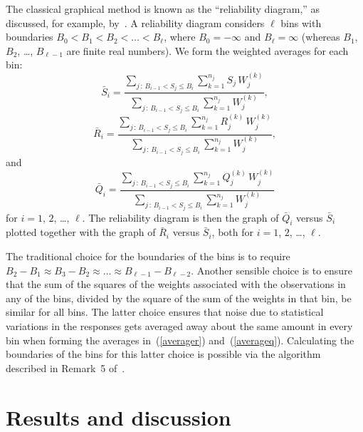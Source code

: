 \documentclass[]{fairmeta}
\begin{document}
The classical graphical method is known as the ``reliability diagram,''
as discussed, for example, by~\cite{brocker-smith}.
A reliability diagram considers $\ell$ bins with boundaries
$B_0 < B_1 < B_2 < \dots < B_{\ell}$,
where $B_0 = -\infty$ and $B_{\ell} = \infty$
(whereas $B_1$, $B_2$, \dots, $B_{\ell - 1}$ are finite real numbers).
We form the weighted averages for each bin:
%
\begin{equation}
\bar{S}_i = \frac{\sum_{j\,:\,B_{i-1} < S_j \le B_i}
                  \sum_{k=1}^{n_j} S_j \, W^{(k)}_j}
                 {\sum_{j\,:\,B_{i-1} < S_j \le B_i}
                  \sum_{k=1}^{n_j} W^{(k)}_j},
\end{equation}
%
\begin{equation}
\label{averager}
\bar{R}_i = \frac{\sum_{j\,:\,B_{i-1} < S_j \le B_i}
                  \sum_{k=1}^{n_j} R^{(k)}_j \, W^{(k)}_j}
                 {\sum_{j\,:\,B_{i-1} < S_j \le B_i}
                  \sum_{k=1}^{n_j} W^{(k)}_j},
\end{equation}
%
and
%
\begin{equation}
\label{averageq}
\bar{Q}_i = \frac{\sum_{j\,:\,B_{i-1} < S_j \le B_i}
                  \sum_{k=1}^{n_j} Q^{(k)}_j \, W^{(k)}_j}
                 {\sum_{j\,:\,B_{i-1} < S_j \le B_i}
                  \sum_{k=1}^{n_j} W^{(k)}_j}
\end{equation}
%
for $i = 1$, $2$, \dots, $\ell$.
The reliability diagram is then the graph of $\bar{Q}_i$ versus $\bar{S}_i$
plotted together with the graph of $\bar{R}_i$ versus $\bar{S}_i$,
both for $i = 1$, $2$, \dots, $\ell$.

The traditional choice for the boundaries of the bins is to require
$B_2 - B_1 \approx B_3 - B_2 \approx \dots \approx B_{\ell-1} - B_{\ell-2}$.
Another sensible choice is to ensure that the sum of the squares of the weights
associated with the observations in any of the bins,
divided by the square of the sum of the weights in that bin,
be similar for all bins. The latter choice ensures that noise
due to statistical variations in the responses gets averaged away
about the same amount in every bin when forming the averages
in~(\ref{averager}) and~(\ref{averageq}).
Calculating the boundaries of the bins for this latter choice is possible
via the algorithm described in Remark~5 of~\cite{tygert_full}.



\section{Results and discussion}
\label{results}
\end{document}
